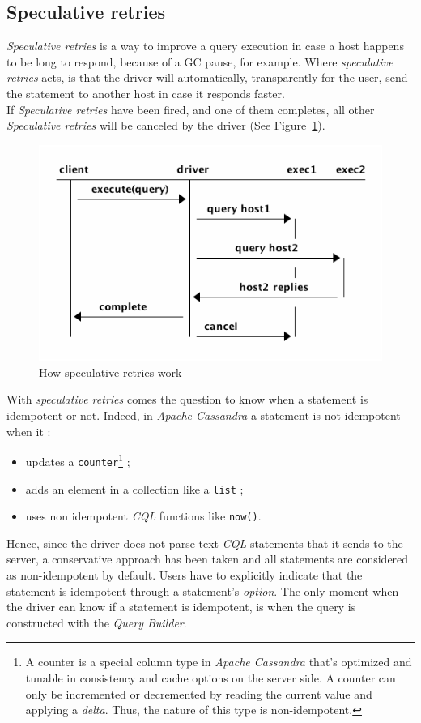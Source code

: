 \documentclass[a4paper]{report}
\newcommand{\ca}{\emph{Apache Cassandra\xspace}}
\newcommand{\sr}{\emph{speculative retries\xspace}}
\begin{document}
\subsection{Speculative retries}
\emph{Speculative retries} is a way to improve a query execution in case a host happens to be long to respond, because of a GC pause, for example. Where \sr{} acts, is that the driver will automatically, transparently for the user, send the statement to another host in case it responds faster.\\
If \emph{Speculative retries} have been fired, and one of them completes, all other \emph{Speculative retries} will be canceled by the driver (See Figure~\ref{fig:sr_1}).\\
\begin{figure}[ht!]
\centering
\includegraphics[scale=0.7]{spec_rec.png}
\caption{How speculative retries work}
\label{fig:sr_1}
\end{figure}
With \sr{} comes the question to know when a statement is idempotent or not. Indeed, in \ca{} a statement is not idempotent when it : 
\begin{itemize}
   \item updates a \verb;counter;\footnote{A counter is a special column type in \ca{} that's optimized and tunable in consistency and cache options on the server side. A counter can only be incremented or decremented by reading the current value and applying a \emph{delta}. Thus, the nature of this type is non-idempotent.} ;
   \item adds an element in a collection like a \verb;list; ;
   \item uses non idempotent \emph{CQL} functions like \verb;now();.
\end{itemize}
Hence, since the driver does not parse text \emph{CQL} statements that it sends to the server, a conservative approach has been taken and all statements are considered as non-idempotent by default. Users have to explicitly indicate that the statement is idempotent through a statement's \emph{option}. The only moment when the driver can know if a statement is idempotent, is when the query is constructed with the \emph{Query Builder}.\\
\end{document}
